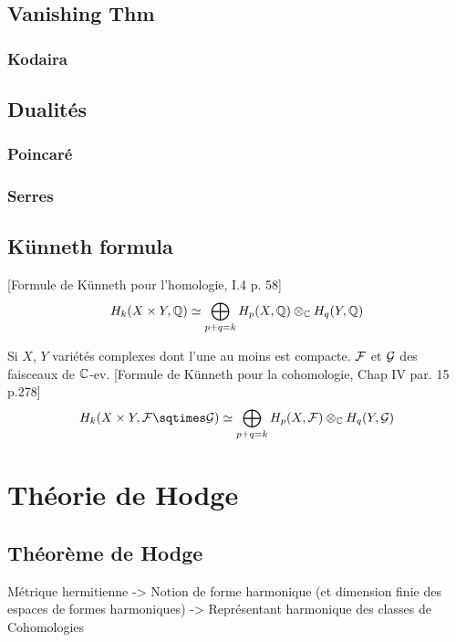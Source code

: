 \section{Vanishing Thm}

\subsection{Kodaira}

\section{Dualités}

\subsection{Poincaré}

\subsection{Serres}

\section{Künneth formula}
[Formule de Künneth pour l'homologie, \cite{GH} I.4 p. 58]
\begin{equation}\label{Kunneth}
H_{k}(X\times Y,\mathbb{Q}) \simeq \bigoplus_{p+q=k} H_p(X,\mathbb{Q}) \otimes_{\mathbb{C}} H_q(Y,\mathbb{Q})
\end{equation}

Si $X$, $Y$ variétés complexes dont l'une au moins est compacte. $\mathcal{F}$ et $\mathcal{G}$ des faisceaux de $\mathbb{C}$-ev.
[Formule de Künneth pour la cohomologie, \cite{Demailly} Chap IV par. 15 p.278]
\begin{equation}\label{CoKunneth}
H_{k}(X \times Y,\Ff \sqtimes \Gg) \simeq \bigoplus_{p+q=k} H_p(X,\Ff) \otimes_\C H_q(Y,\Gg)
\end{equation}

\chapter{Théorie de Hodge}

\section{Théorème de Hodge}
Métrique hermitienne
->
Notion de forme harmonique (et dimension finie des espaces de formes harmoniques)
->
Représentant harmonique des classes de Cohomologies

